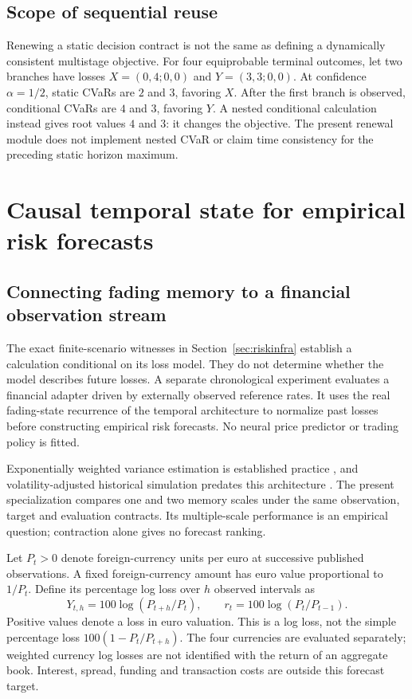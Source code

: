 \documentclass[11pt,a4paper]{article}
\theoremstyle{definition}\newtheorem{definition}[theorem]{Definition}
\begin{document}
\subsection{Scope of sequential reuse}
Renewing a static decision contract is not the same as defining a dynamically
consistent multistage objective. For four equiprobable terminal outcomes, let
two branches have losses $X=(0,4;0,0)$ and $Y=(3,3;0,0)$. At confidence
$\alpha=1/2$, static CVaRs are $2$ and $3$, favoring $X$. After the first branch
is observed, conditional CVaRs are $4$ and $3$, favoring $Y$. A nested
conditional calculation instead gives root values $4$ and $3$: it changes the
objective. The present renewal module does not implement nested CVaR or claim
time consistency for the preceding static horizon maximum.


\section{Causal temporal state for empirical risk forecasts}\label{sec:empiricalrisk}
\subsection{Connecting fading memory to a financial observation stream}
The exact finite-scenario witnesses in Section~\ref{sec:riskinfra} establish a calculation conditional on its loss model. They do not determine whether the model describes future losses. A separate chronological experiment evaluates a financial adapter driven by externally observed reference rates. It uses the real fading-state recurrence of the temporal architecture to normalize past losses before constructing empirical risk forecasts. No neural price predictor or trading policy is fitted.

Exponentially weighted variance estimation is established practice \cite{riskmetrics1996}, and volatility-adjusted historical simulation predates this architecture \cite{hull1998volatility}. The present specialization compares one and two memory scales under the same observation, target and evaluation contracts. Its multiple-scale performance is an empirical question; contraction alone gives no forecast ranking.

Let $P_t>0$ denote foreign-currency units per euro at successive published observations. A fixed foreign-currency amount has euro value proportional to $1/P_t$. Define its percentage log loss over $h$ observed intervals as
\begin{equation}
 Y_{t,h}=100\log(P_{t+h}/P_t),\qquad r_t=100\log(P_t/P_{t-1}).
 \label{eq:fxlogloss}
\end{equation}
Positive values denote a loss in euro valuation. This is a log loss, not the simple percentage loss $100(1-P_t/P_{t+h})$. The four currencies are evaluated separately; weighted currency log losses are not identified with the return of an aggregate book. Interest, spread, funding and transaction costs are outside this forecast target.
\end{document}
